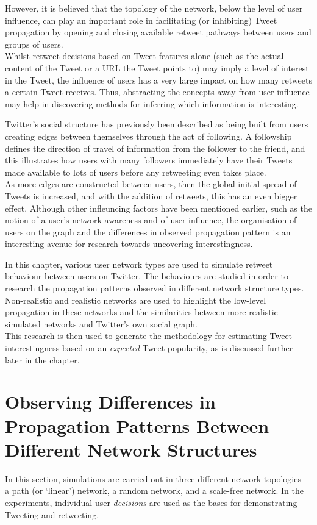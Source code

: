 However, it is believed that the topology of the network, below the level of user influence, can play an important role in facilitating (or inhibiting) Tweet propagation by opening and closing available retweet pathways between users and groups of users.\\
Whilst retweet decisions based on Tweet features alone (such as the actual content of the Tweet or a URL the Tweet points to) may imply a level of interest in the Tweet, the influence of users has a very large impact on how many retweets a certain Tweet receives. Thus, abstracting the concepts away from user influence may help in discovering methods for inferring which information is interesting.

Twitter's social structure has previously been described as being built from users creating edges between themselves through the act of following. A followship defines the direction of travel of information from the follower to the friend, and this illustrates how users with many followers immediately have their Tweets made available to lots of users before any retweeting even takes place.\\
As more edges are constructed between users, then the global initial spread of Tweets is increased, and with the addition of retweets, this has an even bigger effect. Although other infleuncing factors have been mentioned earlier, such as the notion of a user's network awareness and of user influence, the organisation of users on the graph and the differences in observed propagation pattern is an interesting avenue for research towards uncovering interestingness.

In this chapter, various user network types are used to simulate retweet behaviour between users on Twitter. The behaviours are studied in order to research the propagation patterns observed in different network structure types. Non-realistic and realistic networks are used to highlight the low-level propagation in these networks and the similarities between more realistic simulated networks and Twitter's own social graph.\\
This research is then used to generate the methodology for estimating Tweet interestingness based on an \textit{expected} Tweet popularity, as is discussed further later in the chapter.


\section{Observing Differences in Propagation Patterns Between Different Network Structures}
In this section, simulations are carried out in three different network topologies - a path (or `linear') network, a random network, and a scale-free network. In the experiments, individual user \textit{decisions} are used as the bases for demonstrating Tweeting and retweeting.  

